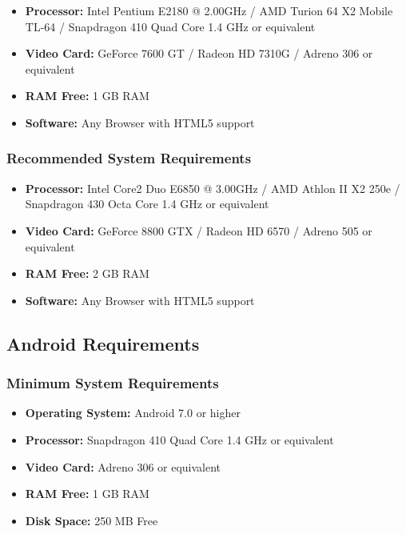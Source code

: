 \begin {itemize}	
	\item \textbf{Processor:} Intel Pentium E2180 @ 2.00GHz / AMD Turion 64 X2 Mobile TL-64 /  Snapdragon 410 Quad Core 1.4 GHz or equivalent
	\item \textbf{Video Card:}  GeForce 7600 GT / Radeon HD 7310G / Adreno 306 or equivalent
	\item \textbf{RAM Free:}  1 GB RAM
	\item \textbf{Software:} Any Browser with HTML5 support

\end {itemize}

\subsubsection{Recommended System Requirements}

\begin {itemize}	
	\item \textbf{Processor:} Intel Core2 Duo E6850 @ 3.00GHz / AMD Athlon II X2 250e /  Snapdragon 430 Octa Core 1.4 GHz or equivalent
	\item \textbf{Video Card:}  GeForce 8800 GTX / Radeon HD 6570 / Adreno 505 or equivalent
	\item \textbf{RAM Free:}  2 GB RAM
	\item \textbf{Software:} Any Browser with HTML5 support

\end {itemize}

\subsection{Android Requirements}

\subsubsection{Minimum System Requirements}

\begin {itemize}	
	\item \textbf{Operating System:} Android 7.0 or higher
	\item \textbf{Processor:} Snapdragon 410 Quad Core 1.4 GHz or equivalent
	\item \textbf{Video Card:}  Adreno 306 or equivalent
	\item \textbf{RAM Free:}  1 GB RAM
	\item \textbf{Disk Space:} 250 MB Free


\end {itemize}

